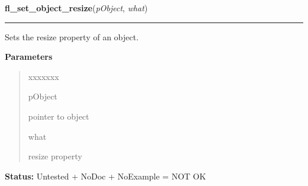 \hspace{.8\funcindent}\begin{boxedminipage}{\funcwidth}

    \raggedright \textbf{fl\_set\_object\_resize}(\textit{pObject}, \textit{what})

    \vspace{-1.5ex}

    \rule{\textwidth}{0.5\fboxrule}
\setlength{\parskip}{2ex}
    Sets the resize property of an object.

\setlength{\parskip}{1ex}
      \textbf{Parameters}
      \vspace{-1ex}

      \begin{quote}
        \begin{Ventry}{xxxxxxx}

          \item[pObject]

          pointer to object

          \item[what]

          resize property

        \end{Ventry}

      \end{quote}

\textbf{Status:} Untested + NoDoc + NoExample = NOT OK



    \end{boxedminipage}

    \label{xformslib:library:fl_get_object_resize}

    \vspace{0.5ex}

